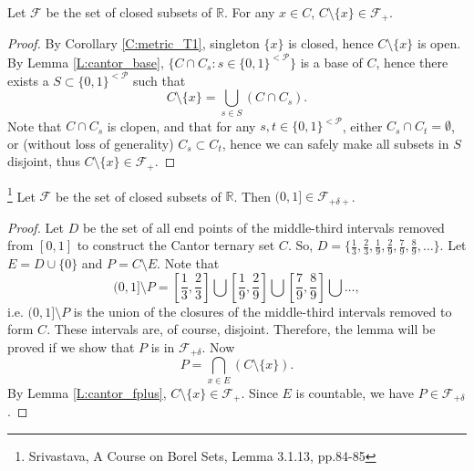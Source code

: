 \begin{lemma} \label{L:cantor_fplus}
Let $\mathcal{F}$ be the set of closed subsets of $\mathbb{R}$. For any $x\in C$, 
$C\setminus \{x\}\in \mathcal{F}_+$.
\end{lemma}
\begin{proof}
By Corollary \ref{C:metric_T1}, singleton $\{x\}$ is closed, hence 
$C\setminus \{x\}$ is open. By Lemma \ref{L:cantor_base}, 
$\{C\cap C_s: s\in\{0,1\}^{<\mathcal{P}} \}$ is a base of $C$, hence
there exists a $S\subset \{0,1\}^{<\mathcal{P}}$ such that 
\[
  C\setminus \{x\} = \bigcup_{s\in S} (C\cap C_s).
\]
Note that $C\cap C_s$ is clopen, and that for any 
$s,t\in \{0,1\}^{<\mathcal{P}}$, either $C_s\cap C_t=\emptyset$, or (without
loss of generality) $C_s\subset C_t$, hence we can safely make all
subsets in $S$ disjoint, thus $C\setminus \{x\}\in \mathcal{F}_+$.
\end{proof}


\begin{lemma} \label{L:cantor_fplus2}
\footnote{Srivastava, A Course on Borel Sets, Lemma 3.1.13, pp.84-85}
Let $\mathcal{F}$ be the set of closed subsets of $\mathbb{R}$. 
Then $(0,1]\in \mathcal{F}_{+\delta +}$.
\end{lemma}
\begin{proof}
Let $D$ be the set of all end points of the middle-third intervals removed from
$[0,1]$ to construct the Cantor ternary set $C$. So, 
$D=\{\frac{1}{3},\frac{2}{3},\frac{1}{9},\frac{2}{9},\frac{7}{9},\frac{8}{9},\dots
\}$. Let $E=D\cup \{0\}$ and $P=C\setminus E$. Note that
\[
  (0,1]\setminus P = \left[ \frac{1}{3},\frac{2}{3} \right] \bigcup 
                     \left[ \frac{1}{9},\frac{2}{9} \right] \bigcup
                     \left[ \frac{7}{9},\frac{8}{9} \right] \bigcup \dots,
\]
i.e. $(0,1]\setminus P$ is the union of the closures of the middle-third
intervals removed to form $C$. These intervals are, of course, disjoint.
Therefore, the lemma will be proved if we show that $P$ is in
$\mathcal{F}_{+\delta}$. Now
\[
  P=\bigcap_{x\in E} (C\setminus \{ x \}).
\]
By Lemma \ref{L:cantor_fplus}, $C\setminus \{ x \} \in \mathcal{F}_+$. Since $E$
is countable, we have $P\in \mathcal{F}_{+\delta}$.
\end{proof}


